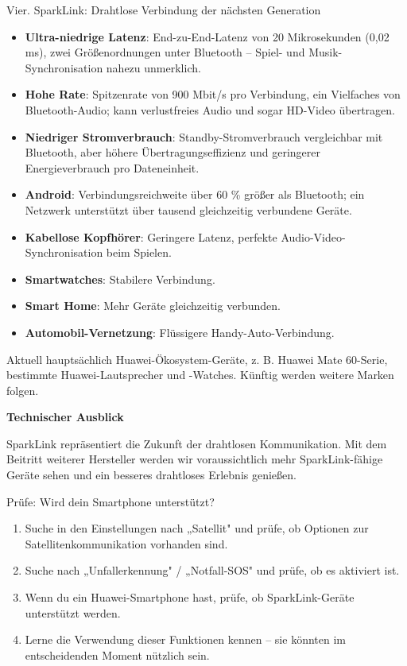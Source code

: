 Vier. SparkLink: Drahtlose Verbindung der nächsten Generation


\begin{itemize}
  \item \textbf{Ultra-niedrige Latenz}: End-zu-End-Latenz von 20 Mikrosekunden (0,02 ms), zwei Größenordnungen unter Bluetooth – Spiel- und Musik-Synchronisation nahezu unmerklich.
  \item \textbf{Hohe Rate}: Spitzenrate von 900 Mbit/s pro Verbindung, ein Vielfaches von Bluetooth-Audio; kann verlustfreies Audio und sogar HD-Video übertragen.
  \item \textbf{Niedriger Stromverbrauch}: Standby-Stromverbrauch vergleichbar mit Bluetooth, aber höhere Übertragungseffizienz und geringerer Energieverbrauch pro Dateneinheit.
  \item \textbf{Android}: Verbindungsreichweite über 60 \% größer als Bluetooth; ein Netzwerk unterstützt über tausend gleichzeitig verbundene Geräte.
\end{itemize}


\begin{itemize}
  \item \textbf{Kabellose Kopfhörer}: Geringere Latenz, perfekte Audio-Video-Synchronisation beim Spielen.
  \item \textbf{Smartwatches}: Stabilere Verbindung.
  \item \textbf{Smart Home}: Mehr Geräte gleichzeitig verbunden.
  \item \textbf{Automobil-Vernetzung}: Flüssigere Handy-Auto-Verbindung.
\end{itemize}


Aktuell hauptsächlich Huawei-Ökosystem-Geräte, z. B. Huawei Mate 60-Serie, bestimmte Huawei-Lautsprecher und -Watches. Künftig werden weitere Marken folgen.

\textbf{Technischer Ausblick}\par

SparkLink repräsentiert die Zukunft der drahtlosen Kommunikation. Mit dem Beitritt weiterer Hersteller werden wir voraussichtlich mehr SparkLink-fähige Geräte sehen und ein besseres drahtloses Erlebnis genießen.

\begin{tcbpractice}{Prüfe: Wird dein Smartphone unterstützt?}
\begin{enumerate}
  \item Suche in den Einstellungen nach „Satellit" und prüfe, ob Optionen zur Satellitenkommunikation vorhanden sind.
  \item Suche nach „Unfallerkennung" / „Notfall-SOS" und prüfe, ob es aktiviert ist.
  \item Wenn du ein Huawei-Smartphone hast, prüfe, ob SparkLink-Geräte unterstützt werden.
  \item Lerne die Verwendung dieser Funktionen kennen – sie könnten im entscheidenden Moment nützlich sein.
\end{enumerate}

\end{tcbpractice}
